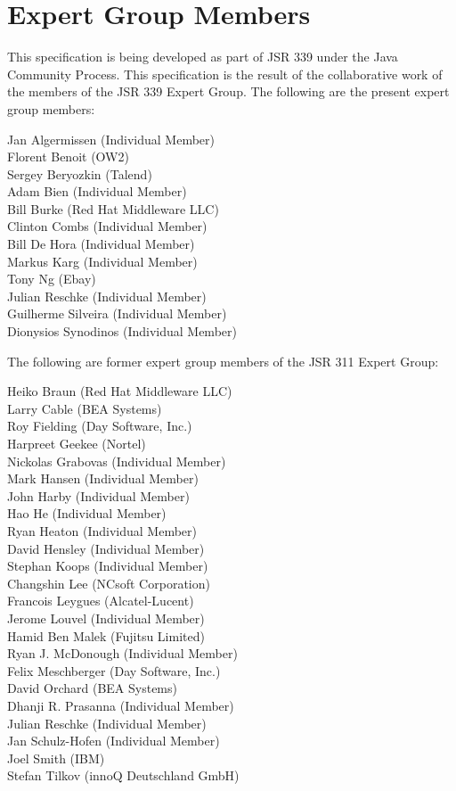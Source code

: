 \section{Expert Group Members} 

This specification is being developed as part of JSR 339 under the Java Community Process. This specification is the result of the collaborative work of the members of the JSR 339 Expert Group. The following are the present expert group members:

Jan Algermissen (Individual Member) \\
Florent Benoit (OW2) \\
Sergey Beryozkin (Talend) \\
Adam Bien (Individual Member) \\
Bill Burke (Red Hat Middleware LLC) \\
Clinton Combs (Individual Member) \\
Bill De Hora (Individual Member) \\ 
Markus Karg (Individual Member) \\
Tony Ng (Ebay) \\
Julian Reschke (Individual Member) \\
Guilherme Silveira (Individual Member) \\
Dionysios Synodinos (Individual Member)

The following are former expert group members of the JSR 311 Expert Group:

Heiko Braun (Red Hat Middleware LLC) \\
Larry Cable (BEA Systems) \\
Roy Fielding (Day Software, Inc.) \\
Harpreet Geekee (Nortel) \\
Nickolas Grabovas (Individual Member) \\
Mark Hansen (Individual Member) \\
John Harby (Individual Member) \\
Hao He (Individual Member) \\
Ryan Heaton (Individual Member) \\
David Hensley (Individual Member) \\
Stephan Koops (Individual Member) \\
Changshin Lee (NCsoft Corporation) \\
Francois Leygues (Alcatel-Lucent) \\
Jerome Louvel (Individual Member) \\
Hamid Ben Malek (Fujitsu Limited) \\
Ryan J. McDonough (Individual Member) \\
Felix Meschberger (Day Software, Inc.) \\
David Orchard (BEA Systems) \\
Dhanji R. Prasanna (Individual Member) \\
Julian Reschke (Individual Member) \\
Jan Schulz-Hofen (Individual Member) \\
Joel Smith (IBM) \\
Stefan Tilkov (innoQ Deutschland GmbH)

